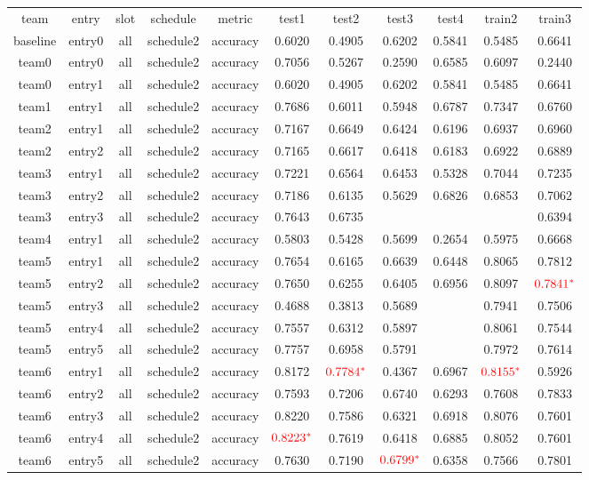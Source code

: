 \begin{footnotesize}
\begin{tabular}{c|c|c|c|c|c|c|c|c|c|c}
team&entry&slot&schedule&metric&test1&test2&test3&test4&train2&train3\\
baseline&entry0&all&schedule2&accuracy&0.6020&0.4905&0.6202&0.5841&0.5485&0.6641\\
team0&entry0&all&schedule2&accuracy&0.7056&0.5267&0.2590&0.6585&0.6097&0.2440\\
team0&entry1&all&schedule2&accuracy&0.6020&0.4905&0.6202&0.5841&0.5485&0.6641\\
team1&entry1&all&schedule2&accuracy&0.7686&0.6011&0.5948&0.6787&0.7347&0.6760\\
team2&entry1&all&schedule2&accuracy&0.7167&0.6649&0.6424&0.6196&0.6937&0.6960\\
team2&entry2&all&schedule2&accuracy&0.7165&0.6617&0.6418&0.6183&0.6922&0.6889\\
team3&entry1&all&schedule2&accuracy&0.7221&0.6564&0.6453&0.5328&0.7044&0.7235\\
team3&entry2&all&schedule2&accuracy&0.7186&0.6135&0.5629&0.6826&0.6853&0.7062\\
team3&entry3&all&schedule2&accuracy&0.7643&0.6735&&&&0.6394\\
team4&entry1&all&schedule2&accuracy&0.5803&0.5428&0.5699&0.2654&0.5975&0.6668\\
team5&entry1&all&schedule2&accuracy&0.7654&0.6165&0.6639&0.6448&0.8065&0.7812\\
team5&entry2&all&schedule2&accuracy&0.7650&0.6255&0.6405&0.6956&0.8097&{$\color{red}0.7841^*$}\\
team5&entry3&all&schedule2&accuracy&0.4688&0.3813&0.5689&&0.7941&0.7506\\
team5&entry4&all&schedule2&accuracy&0.7557&0.6312&0.5897&&0.8061&0.7544\\
team5&entry5&all&schedule2&accuracy&0.7757&0.6958&0.5791&&0.7972&0.7614\\
team6&entry1&all&schedule2&accuracy&0.8172&{$\color{red}0.7784^*$}&0.4367&0.6967&{$\color{red}0.8155^*$}&0.5926\\
team6&entry2&all&schedule2&accuracy&0.7593&0.7206&0.6740&0.6293&0.7608&0.7833\\
team6&entry3&all&schedule2&accuracy&0.8220&0.7586&0.6321&0.6918&0.8076&0.7601\\
team6&entry4&all&schedule2&accuracy&{$\color{red}0.8223^*$}&0.7619&0.6418&0.6885&0.8052&0.7601\\
team6&entry5&all&schedule2&accuracy&0.7630&0.7190&{$\color{red}0.6799^*$}&0.6358&0.7566&0.7801\\

\end{tabular}
\end{footnotesize}
